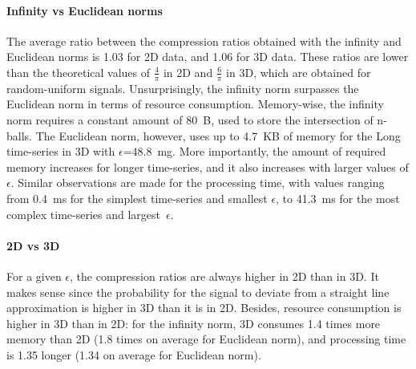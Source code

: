 \paragraph{Infinity vs Euclidean norms}
The average ratio between the compression ratios obtained with the infinity and
Euclidean norms is 1.03 for 2D data, and 1.06 for 3D data. These ratios are
lower than the theoretical values of $\frac{4}{\pi}$ in 2D and $\frac{6}{\pi}$
in 3D, which are obtained for random-uniform signals. Unsurprisingly, the
infinity norm surpasses the Euclidean norm in terms of resource consumption.
Memory-wise, the infinity norm requires a constant amount of 80~B, used to store
the intersection of n-balls. The Euclidean norm, however, uses up to 4.7~KB of
memory for the Long time-series in 3D with $\epsilon$=48.8~mg. More importantly,
the amount of required memory increases for longer time-series, and it also
increases with larger values of $\epsilon$. Similar observations are made for
the processing time, with values ranging from 0.4~ms for the simplest
time-series and smallest $\epsilon$, to 41.3~ms for the most complex time-series
and largest~$\epsilon$.

\paragraph{2D vs 3D}
For a given $\epsilon$, the compression
ratios are always higher in 2D than in 3D. It makes sense since the
probability for the signal to deviate from a straight line
approximation is higher in 3D than it is in 2D. Besides, resource
consumption is higher in 3D than in 2D: for the infinity norm, 3D
consumes 1.4 times more memory than 2D (1.8 times on average for
Euclidean norm), and processing time is 1.35 longer (1.34 on
average for Euclidean norm).

